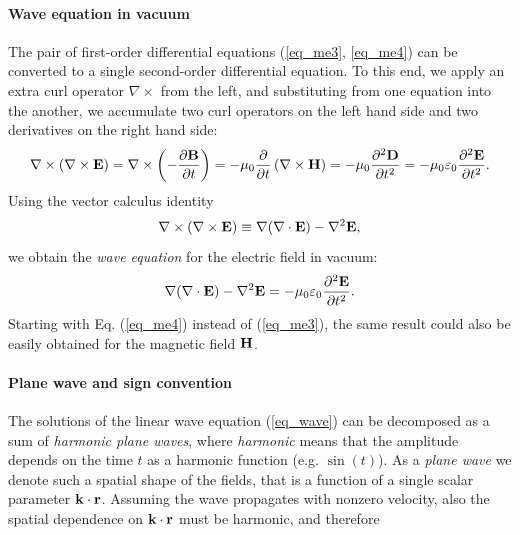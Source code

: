 \paragraph{Wave equation in vacuum} %
\label{starttext}
The pair of first-order differential equations (\ref{eq_me3}, \ref{eq_me4}) can be converted to a single second-order differential equation. To this end, we apply an extra curl operator $\nabla\times$ from the left, and substituting from one equation into the another, we accumulate two curl operators on the left hand side and two derivatives on the right hand side: 
\begin{equation} \nabla\times (\nabla\times \mathbf{E}) = \nabla\times \left(- \frac{\partial \mathbf{B}} {\partial t}\right) = -\mu_0 \frac{\partial}{\partial t} \left(\nabla\times \mathbf{H}\right) 
= -\mu_0 \frac{\partial^{2} \mathbf{D}}{\partial t^{2}} = -\mu_0 \varepsilon_0 \frac{\partial^{2} \mathbf{E}}{\partial t^{2}}.  \label{eq_elim}\end{equation}
Using the vector calculus identity
\begin{equation} \nabla\times (\nabla\times \mathbf{E}) \equiv \nabla (\nabla \cdot \mathbf{E}) - \nabla^2 \mathbf{E}, \label{eq_rotrot}\end{equation}
we obtain the \textit{wave equation} for the electric field in vacuum: 
\begin{equation}  \nabla (\nabla \cdot \mathbf{E}) - \nabla^2 \mathbf{E} = -\mu_0 \varepsilon_0 \frac{\partial^{2} \mathbf{E}}{\partial t^{2}}.  \label{eq_wave}\end{equation}
Starting with Eq. (\ref{eq_me4}) instead of (\ref{eq_me3}), the same result could also be easily obtained for the magnetic field $\mathbf{H}$.
\paragraph{Plane wave and sign convention} %
The solutions of the linear wave equation (\ref{eq_wave}) can be decomposed as a sum of \textit{harmonic plane waves}, where \textit{harmonic} means that the amplitude depends on the time $t$ as a harmonic function (e.g. $\sin(t)$). As a \textit{plane wave} we denote such a spatial shape of the fields, that is a function of a single  scalar parameter ${\mathbf{k}}\cdot{\mathbf{r}}$. Assuming the wave propagates with nonzero velocity, also the spatial dependence on  ${\mathbf{k}}\cdot{\mathbf{r}}$ must be harmonic, and therefore 

